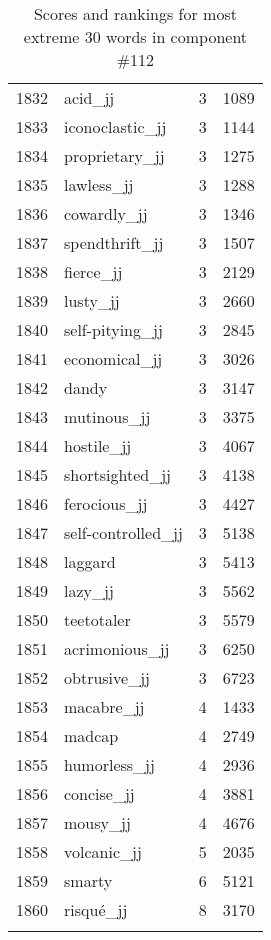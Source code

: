 \begin{longtable}[!htbp]{| rlr@{.}l |}
    1832 & acid\_jj & 3 & 1089 \\
    1833 & iconoclastic\_jj & 3 & 1144 \\
    1834 & proprietary\_jj & 3 & 1275 \\
    1835 & lawless\_jj & 3 & 1288 \\
    1836 & cowardly\_jj & 3 & 1346 \\
    1837 & spendthrift\_jj & 3 & 1507 \\
    1838 & fierce\_jj & 3 & 2129 \\
    1839 & lusty\_jj & 3 & 2660 \\
    1840 & self-pitying\_jj & 3 & 2845 \\
    1841 & economical\_jj & 3 & 3026 \\
    1842 & dandy & 3 & 3147 \\
    1843 & mutinous\_jj & 3 & 3375 \\
    1844 & hostile\_jj & 3 & 4067 \\
    1845 & shortsighted\_jj & 3 & 4138 \\
    1846 & ferocious\_jj & 3 & 4427 \\
    1847 & self-controlled\_jj & 3 & 5138 \\
    1848 & laggard & 3 & 5413 \\
    1849 & lazy\_jj & 3 & 5562 \\
    1850 & teetotaler & 3 & 5579 \\
    1851 & acrimonious\_jj & 3 & 6250 \\
    1852 & obtrusive\_jj & 3 & 6723 \\
    1853 & macabre\_jj & 4 & 1433 \\
    1854 & madcap & 4 & 2749 \\
    1855 & humorless\_jj & 4 & 2936 \\
    1856 & concise\_jj & 4 & 3881 \\
    1857 & mousy\_jj & 4 & 4676 \\
    1858 & volcanic\_jj & 5 & 2035 \\
    1859 & smarty & 6 & 5121 \\
    1860 & risqué\_jj & 8 & 3170 \\
    \hline
    \caption{Scores and rankings for most extreme 30 words in component \#112} \\
\end{longtable}
